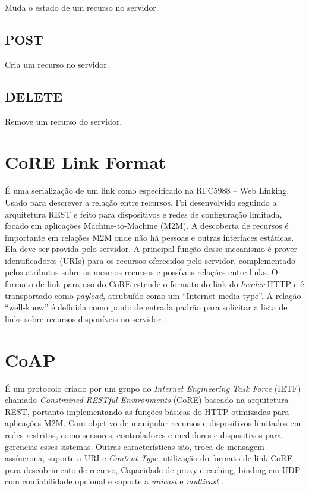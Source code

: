 Muda o estado de um recurso no servidor.

\subsection{POST}
Cria um recurso no servidor.

\subsection{DELETE}
Remove um recurso do servidor.

\section{CoRE Link Format}

É uma serialização de um link como especificado na RFC5988 – Web Linking. Usado para descrever a relação entre recursos. Foi desenvolvido seguindo a arquitetura REST e feito para dispositivos e redes de configuração limitada, focado em aplicações Machine-to-Machine (M2M). A descoberta de recursos é importante em relações M2M onde não há pessoas e outras interfaces estáticas. Ela deve ser provida pelo servidor.
A principal função desse mecanismo é prover identificadores (URIs) para os recursos oferecidos pelo servidor, complementado pelos atributos sobre os mesmos recursos e possíveis relações entre links. O formato de link para uso do CoRE estende o formato do link do \textit{header} HTTP e é transportado como \textit{payload}, atrubuído como um “Internet media type”. A relação “well-know” é definida como ponto de entrada padrão para solicitar a lista de links sobre recursos disponíveis no servidor \cite{rfc6690_core_link_format}.

\section{CoAP}

É um protocolo criado por um grupo do \textit{Internet Engineering Task Force} (IETF) chamado \textit{Constrained RESTful Environments} (CoRE) baseado na arquitetura REST, portanto implementando as funções básicas do HTTP otimizadas para aplicações M2M. Com objetivo de manipular recursos e dispositivos limitados em redes restritas, como sensores, controladores e medidores e dispositivos para gerencias esses sistemas.
Outras características são, troca de mensagem assíncrona, suporte a URI e \textit{Content-Type}. utilização do formato de link CoRE para descobrimento de recurso, Capacidade de proxy e caching, binding em UDP com confiabilidade opcional e suporte a \textit{unicast} e \textit{multicast} \cite{coap_mqtt_artigo} \cite{rfc7252_CoAP}.


